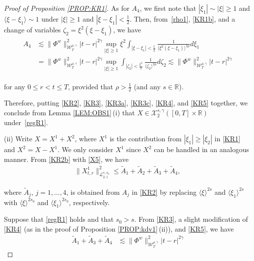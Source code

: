 \documentclass[letterpaper, 11pt,  reqno]{amsart}
\DeclareMathOperator*{\intt}{\int}
\newcommand{\1}{\hspace{0.5mm}\text{I}\hspace{0.5mm}}
\newcommand{\noi}{\noindent}
\newcommand{\R}{\mathbb{R}}
\newcommand{\g}{\gamma}
\newcommand{\wt}{\widetilde}
\newcommand{\les}{\lesssim}
\newcommand{\jb}[1]
{\langle #1 \rangle}
\newcommand{\cL}{\mathcal{L}}
\newcommand{\cX}{\mathcal{X}}
\newcommand{\W}{\mathcal{W}}
\newcommand{\z}{\zeta}
\numberwithin{equation}{section}
\numberwithin{theorem}{section}
\begin{document}
\begin{proof}[Proof of Proposition \ref{PROP:KR1}]
As for $A_4$, 
we first note that 
$ |\xi_1|\sim |\xi| \ge 1$
and $\jb{\xi - \xi_1}\sim 1$
under 
 $|\xi|\ge1$ and $|\xi - \xi_1|< \frac12 $.
 Then, from~\eqref{rho1}, \eqref{KR1b},  and 
 a change of variables $\zeta_2 = \xi^2 (\xi - \xi_1)$, we have 
 \begin{align}
\begin{aligned}
A_4
&\les
\|\Phi^w\|^2_{\W_T^{\rho,\g}}
|t-r |^{2\g }    \sup_{|\xi|\ge 1}  \xi^2
  \intt_{|\xi - \xi_1|< \frac 12} 
\frac{ 1}{  \jb{\xi^2(\xi - \xi_1)}^{2\rho}} d \xi_1\\
&= 
\|\Phi^w\|^2_{\W_T^{\rho,\g}}
|t-r |^{2\g }  
   \sup_{|\xi|\ge 1} 
  \intt_{|\z_2|< \frac {\xi^2}2} 
 \frac{1}{\jb{\z_2}^{2\rho} }d \z_2
 \les \|\Phi^w\|^2_{\W_T^{\rho,\g}}
|t-r |^{2\g } 
\end{aligned}
\label{KR5}
\end{align}

\noi
for any $0 \le r <  t \le T$, provided that $\rho > \frac 12$
(and any $s \in \R$).



Therefore, putting \eqref{KR2}, 
\eqref{KR3}, 
\eqref{KR3a}, 
\eqref{KR3c}, 
\eqref{KR4}, and \eqref{KR5}
together, we conclude 
from  Lemma \ref{LEM:OBS1}\,(i)
that 
 $X\in  \cX^{s, \g}_2([0, T]\times \R)$ under~\eqref{regR1}.




\medskip

\noi
(ii)  Write $X = X^1 + X^2$, 
where $X^1$ is the contribution from $|\xi_1| \ge |\xi_2|$ in \eqref{KR1}
and $X^2 = X - X^1$.
We only consider $X^1$ since $X^2$ can be handled 
in an analogous manner.
From \eqref{KR2b}
with \eqref{X5}, we have 
\begin{align*}
\|X^1_{t,r} \|_{\cL_{2, 1}^{s, s_0}}^2
 \le \wt A_1+ \wt A_2 + \wt A_3 +\wt  A_4, 
\end{align*}




\noi
where $\wt A_j$, $j = 1, \dots, 4$, 
is obtained from $A_j$ in \eqref{KR2}
by replacing 
$\jb{\xi}^{2s}$
and $\jb{\xi_1}^{2s}$
with $\jb{\xi}^{2s_0}$
and $\jb{\xi_1}^{2s_0}$, respectively.
 

Suppose that  \eqref{regR1} holds and that $s_0 > s$.
From 
\eqref{KR3}, 
a slight modification of \eqref{KR4}
(as in the proof of Proposition \ref{PROP:kdv1}\,(ii)), and 
\eqref{KR5}, 
we have 
\begin{align*}
\wt A_1 + 
\wt A_3 + 
\wt A_4
& \les
\|\Phi^w\|^2_{\W_T^{\rho,\g}}|t-r |^{2\g}
\end{align*}


\end{proof}
\end{document}

